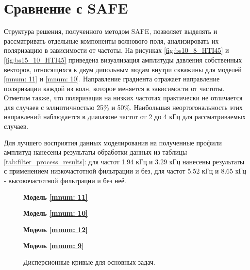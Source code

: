 \documentclass[a4paper,11pt]{article}
\begin{document}
\section{Сравнение с SAFE}
\label{safe_comparison}

Структура решения, полученного методом SAFE, позволяет выделять и рассматривать отдельные компоненты волнового поля, анализировать их поляризацию в зависимости от частоты. На рисунках \ref{fig:bs10_8_HTI45} и \ref{fig:bs15_10_HTI45} приведена визуализация амплитуды давления собственных векторов, относящихся к двум дипольным модам внутри скважины для моделей \ref{mnum: 11} и \ref{mnum: 10}. Направление градиента отражает направление поляризации каждой из волн, которое меняется в зависимости от частоты. Отметим также, что поляризация на низких частотах практически не отличается для случаев с эллиптичностью 25\% и 50\%. Наибольшая неортогональность этих направлений наблюдается в диапазоне частот от 2 до 4 кГц для рассматриваемых случаев. 

Для лучшего восприятия данных моделирования на полученные профили амплитуд нанесены результаты обработки данных из таблицы \ref{tab:filter_process_results}: для частот 1.94 кГц и 3.29 кГц нанесены результаты с применением низкочастотной фильтрации и без, для частот 5.52 кГц и 8.65 кГц - высокочастотной фильтрации и без неё. 

\begin{figure}[h]
\centering
\begin{minipage}{0.49\linewidth}
	\centering \textbf{Модель \ref{mnum: 11}}
	 \\
\end{minipage}
\begin{minipage}{0.49\linewidth}
	\centering \textbf{Модель \ref{mnum: 10}}
	 \\
\end{minipage}
\begin{minipage}{0.49\linewidth}
	\centering \textbf{Модель \ref{mnum: 12}}
	 \\
\end{minipage}
\begin{minipage}{0.49\linewidth}
	\centering \textbf{Модель \ref{mnum: 9}}
	 \\
\end{minipage}
\caption{Дисперсионные кривые для основных задач. }
\label{fig:disp_curves_all}
\end{figure}
\end{document}
